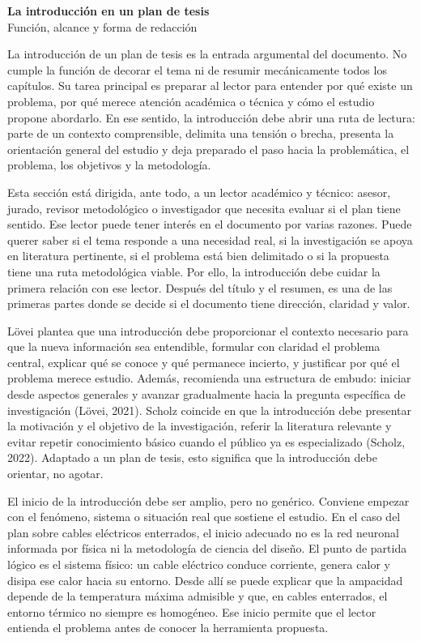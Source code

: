 \documentclass[11pt]{article}
\begin{document}
\begin{center}
{\Large \textbf{La introducción en un plan de tesis}}\\[0.3em]
{\large Función, alcance y forma de redacción}
\end{center}

La introducción de un plan de tesis es la entrada argumental del documento. No cumple la función de decorar el tema ni de resumir mecánicamente todos los capítulos. Su tarea principal es preparar al lector para entender por qué existe un problema, por qué merece atención académica o técnica y cómo el estudio propone abordarlo. En ese sentido, la introducción debe abrir una ruta de lectura: parte de un contexto comprensible, delimita una tensión o brecha, presenta la orientación general del estudio y deja preparado el paso hacia la problemática, el problema, los objetivos y la metodología.

Esta sección está dirigida, ante todo, a un lector académico y técnico: asesor, jurado, revisor metodológico o investigador que necesita evaluar si el plan tiene sentido. Ese lector puede tener interés en el documento por varias razones. Puede querer saber si el tema responde a una necesidad real, si la investigación se apoya en literatura pertinente, si el problema está bien delimitado o si la propuesta tiene una ruta metodológica viable. Por ello, la introducción debe cuidar la primera relación con ese lector. Después del título y el resumen, es una de las primeras partes donde se decide si el documento tiene dirección, claridad y valor.

Lövei plantea que una introducción debe proporcionar el contexto necesario para que la nueva información sea entendible, formular con claridad el problema central, explicar qué se conoce y qué permanece incierto, y justificar por qué el problema merece estudio. Además, recomienda una estructura de embudo: iniciar desde aspectos generales y avanzar gradualmente hacia la pregunta específica de investigación (Lövei, 2021). Scholz coincide en que la introducción debe presentar la motivación y el objetivo de la investigación, referir la literatura relevante y evitar repetir conocimiento básico cuando el público ya es especializado (Scholz, 2022). Adaptado a un plan de tesis, esto significa que la introducción debe orientar, no agotar.

El inicio de la introducción debe ser amplio, pero no genérico. Conviene empezar con el fenómeno, sistema o situación real que sostiene el estudio. En el caso del plan sobre cables eléctricos enterrados, el inicio adecuado no es la red neuronal informada por física ni la metodología de ciencia del diseño. El punto de partida lógico es el sistema físico: un cable eléctrico conduce corriente, genera calor y disipa ese calor hacia su entorno. Desde allí se puede explicar que la ampacidad depende de la temperatura máxima admisible y que, en cables enterrados, el entorno térmico no siempre es homogéneo. Ese inicio permite que el lector entienda el problema antes de conocer la herramienta propuesta.
\end{document}
